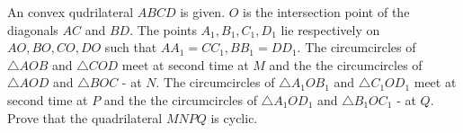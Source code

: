 An convex qudrilateral $ABCD$ is given. $O$ is the intersection point of the diagonals $AC$ and $BD$. The points $A_1,B_1,C_1, D_1$ lie respectively on $AO, BO, CO, DO$ such that $AA_1=CC_1, BB_1=DD_1$.
The circumcircles of $\triangle AOB$ and $\triangle COD$ meet at second time at $M$ and the the circumcircles of $\triangle AOD$ and $\triangle BOC$ - at $N$.
The circumcircles of $\triangle A_1OB_1$ and $\triangle C_1OD_1$ meet at second time at $P$ and the the circumcircles of $\triangle A_1OD_1$ and $\triangle B_1OC_1$ - at $Q$.
Prove that the quadrilateral $MNPQ$ is cyclic.